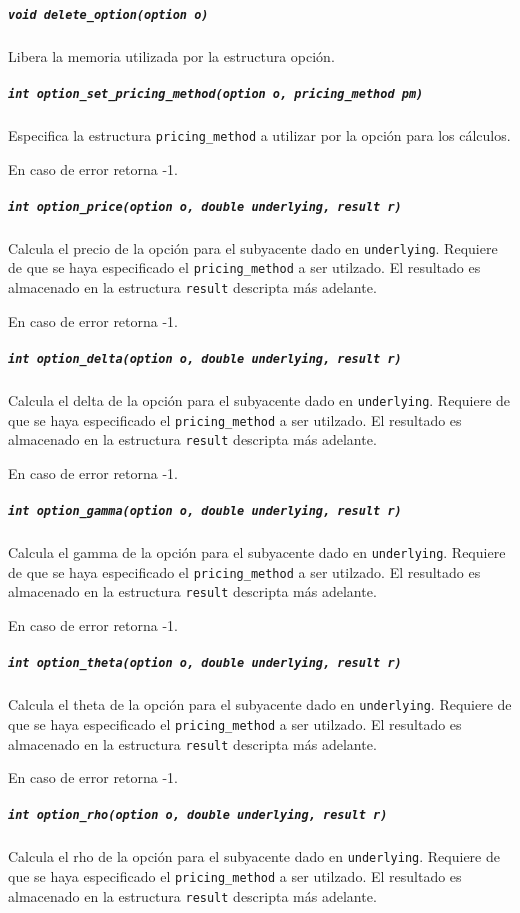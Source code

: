 \documentclass[12pt,a4paper,final]{article}
\begin{document}
			\subparagraph{\texttt{void delete\_option(option o)}}
				Libera la memoria utilizada por la estructura opción.	
					
			\subparagraph{\texttt{int option\_set\_pricing\_method(option o, pricing\_method pm)}}
				Especifica la estructura \texttt{pricing\_method} a utilizar por la opción para
				los cálculos.
					
				En caso de error retorna -1.
					
			\subparagraph{\texttt{int option\_price(option o, double underlying, result r)}}
				Calcula el precio de la opción para el subyacente dado en \texttt{underlying}.
				Requiere de que se haya especificado el \texttt{pricing\_method} a ser utilzado.
				El resultado es almacenado en la estructura \texttt{result} descripta más adelante.
					
				En caso de error retorna -1.
					
			\subparagraph{\texttt{int option\_delta(option o, double underlying, result r)}}
				Calcula el delta de la opción para el subyacente dado en \texttt{underlying}.
				Requiere de que se haya especificado el \texttt{pricing\_method} a ser utilzado.
				El resultado es almacenado en la estructura \texttt{result} descripta más adelante.
					
				En caso de error retorna -1.

			\subparagraph{\texttt{int option\_gamma(option o, double underlying, result r)}}
				Calcula el gamma de la opción para el subyacente dado en \texttt{underlying}.
				Requiere de que se haya especificado el \texttt{pricing\_method} a ser utilzado.
				El resultado es almacenado en la estructura \texttt{result} descripta más adelante.
					
				En caso de error retorna -1.
					
			\subparagraph{\texttt{int option\_theta(option o, double underlying, result r)}}
				Calcula el theta de la opción para el subyacente dado en \texttt{underlying}.
				Requiere de que se haya especificado el \texttt{pricing\_method} a ser utilzado.
				El resultado es almacenado en la estructura \texttt{result} descripta más adelante.
					
				En caso de error retorna -1.
					
			\subparagraph{\texttt{int option\_rho(option o, double underlying, result r)}}
				Calcula el rho de la opción para el subyacente dado en \texttt{underlying}.
				Requiere de que se haya especificado el \texttt{pricing\_method} a ser utilzado.
				El resultado es almacenado en la estructura \texttt{result} descripta más adelante.
					
\end{document}
